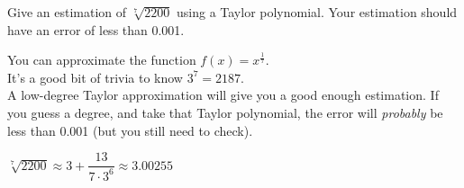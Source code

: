 \begin{Mquestion}
Give an estimation of $\sqrt[7]{2200}$ using a Taylor polynomial. Your estimation should have an error of less than 0.001.
\end{Mquestion}
\begin{hint}
You can approximate the function $f(x)=x^{\tfrac{1}{7}}$.\\ It's a good bit of trivia to know $3^7=2187$.\\
A low-degree Taylor approximation will give you a good enough estimation.
If you guess a degree, and take that Taylor polynomial, the error will \emph{probably} be less than 0.001 (but you still need to check).
\end{hint}
\begin{answer}
$\sqrt[7]{2200}\approx3+\dfrac{13}{7\cdot 3^6}
\approx 3.00255$
\end{answer}
